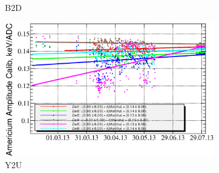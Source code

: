 \documentclass[a4paper,12pt]{article}
\begin{document}
\begin{figure}[p]
\begin{subfigure}[t]{0.49\textwidth}
\caption{B2D}
\end{subfigure}
%
\hfill
%
\begin{subfigure}[t]{0.49\textwidth}
\includegraphics[width=\textwidth]{gfx/run13_alpha_study/Y2U/c_chAmGain_by_day_Y2U.eps}
\caption{Y2U}
\end{subfigure}
%
\caption{\amgainlabel}
\label{fig:am_gain}
\end{figure}
\end{document}
